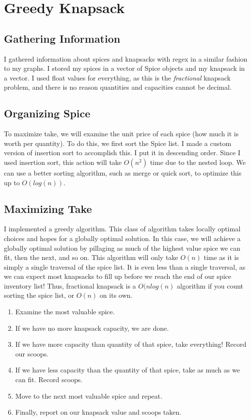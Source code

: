 \documentclass[letterpaper, 10pt]{article}
\begin{document}
\section{Greedy Knapsack}
\subsection{Gathering Information}
I gathered information about spices and knapsacks with regex in a similar fashion to my graphs. I stored my spices in a vector of Spice objects and my knapsack in a vector. I used float values for everything, as this is the \textit{fractional} knapsack problem, and there is no reason quantities and capacities cannot be decimal. 



\subsection{Organizing Spice}
To maximize take, we will examine the unit price of each spice (how much it is worth per quantity). To do this, we first sort the Spice list. I made a custom version of insertion sort to accomplish this. I put it in descending order. Since I used insertion sort, this action will take $O(n^2)$ time due to the nested loop. We can use a better sorting algorithm, such as merge or quick sort, to optimize this up to $O(log(n))$.


\subsection{Maximizing Take}
I implemented a greedy algorithm. This class of algorithm takes locally optimal choices and hopes for a globally optimal solution. In this case, we will achieve a globally optimal solution by pillaging as much of the highest value spice we can fit, then the next, and so on. This algorithm will only take $O(n)$ time as it is simply a single traversal of the spice list. It is even less than a single traversal, as we can expect most knapsacks to fill up before we reach the end of our spice inventory list! Thus, fractional knapsack is a $O(nlog(n)$ algorithm if you count sorting the spice list, or $O(n)$ on its own.
\begin{enumerate}
    \item Examine the most valuable spice.
    \item If we have no more knapsack capacity, we are done.
    \item If we have more capacity than quantity of that spice, take everything! Record our scoops.
    \item If we have less capacity than the quantity of that spice, take as much as we can fit. Record scoops.
    \item Move to the next most valuable spice and repeat.
    \item Finally, report on our knapsack value and scoops taken.
\end{enumerate}

\end{document}
